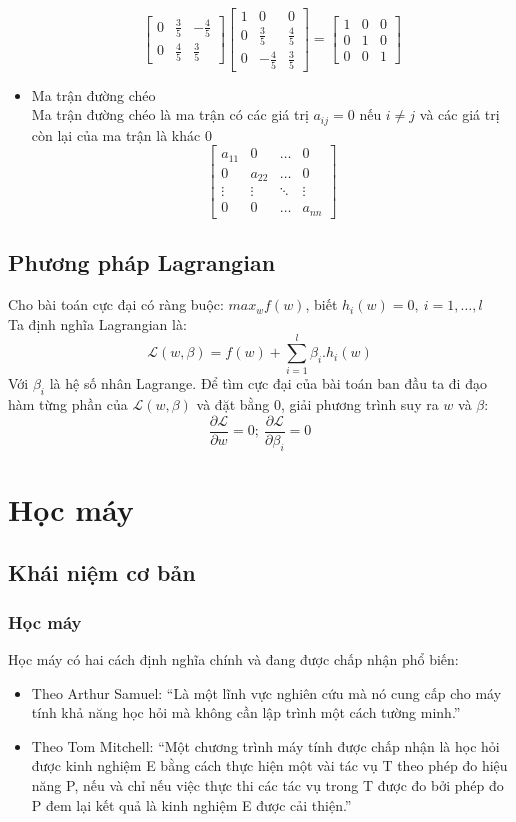 \begin{itemize}
\[\begin{bmatrix}
    0 & \frac{3}{5} & -\frac{4}{5} \\
    0 & \frac{4}{5} & \frac{3}{5}
    \end{bmatrix}
    \begin{bmatrix} 
    1 & 0 & 0 \\
    0 & \frac{3}{5} & \frac{4}{5} \\
    0 & -\frac{4}{5} & \frac{3}{5}
    \end{bmatrix} = 
    \begin{bmatrix} 
    1 & 0 & 0 \\
    0 & 1 & 0 \\
    0 & 0 & 1
    \end{bmatrix}
     \]
     \item Ma trận đường chéo\\
     Ma trận đường chéo là ma trận có các giá trị $a_{ij} = 0$ nếu $i \neq j$ và
     các giá trị còn lại của ma trận là khác 0
     \[\begin{bmatrix} 
    a_{11} & 0 & \dots & 0 \\
    0 &  a_{22} & \dots & 0 \\
    \vdots & \vdots & \ddots & \vdots \\
    0 & 0 &  \dots & a_{nn}
    \end{bmatrix}
     \]
\end{itemize}
\subsection{Phương pháp Lagrangian}
Cho bài toán cực đại có ràng buộc: $ max_w f(w) $, 
biết $ h_i(w)=0,\:i=1,\dots,l $\\
Ta định nghĩa Lagrangian là:
\[ \mathcal{L}(w,\beta) = f(w) + \sum_{i=1}^{l}\beta_i . h_i(w) \]
Với $\beta_i$ là hệ số nhân Lagrange. Để tìm cực đại của bài toán ban đầu ta đi
đạo hàm từng phần của $\mathcal{L}(w,\beta)$ và đặt bằng 0, giải phương trình
suy ra $w$ và $\beta$:
\[ \frac{\partial \mathcal{L}}{\partial w}=0;\: \frac{\partial
\mathcal{L}}{\partial \beta_i}=0\]
\section{Học máy}
\subsection{Khái niệm cơ bản}
\subsubsection{Học máy}
Học máy có hai cách định nghĩa chính và đang được chấp nhận phổ biến:
\begin{itemize}
  \item Theo Arthur Samuel: ``Là một lĩnh vực nghiên cứu mà nó cung cấp cho
  máy tính khả năng học hỏi mà không cần lập trình một cách tường minh.''
  \item Theo Tom Mitchell: ``Một chương trình máy tính được chấp nhận
  là học hỏi được kinh nghiệm E bằng cách thực hiện một vài tác vụ T theo phép đo hiệu
  năng P, nếu và chỉ nếu việc thực thi các tác vụ trong T được đo bởi phép đo P
  đem lại kết quả là kinh nghiệm E được cải thiện.''
\end{itemize}
